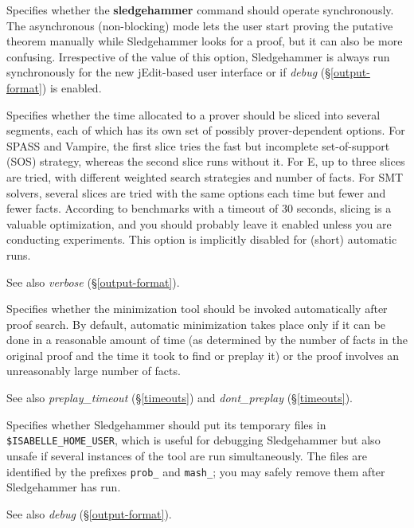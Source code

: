 \documentclass[a4paper,12pt]{article}
\begin{document}
\begin{enum}
Specifies whether the \textbf{sledgehammer} command should operate
synchronously. The asynchronous (non-blocking) mode lets the user start proving
the putative theorem manually while Sledgehammer looks for a proof, but it can
also be more confusing. Irrespective of the value of this option, Sledgehammer
is always run synchronously for the new jEdit-based user interface or if
\textit{debug} (\S\ref{output-format}) is enabled.

Specifies whether the time allocated to a prover should be sliced into several
segments, each of which has its own set of possibly prover-dependent options.
For SPASS and Vampire, the first slice tries the fast but incomplete
set-of-support (SOS) strategy, whereas the second slice runs without it. For E,
up to three slices are tried, with different weighted search strategies and
number of facts. For SMT solvers, several slices are tried with the same options
each time but fewer and fewer facts. According to benchmarks with a timeout of
30 seconds, slicing is a valuable optimization, and you should probably leave it
enabled unless you are conducting experiments. This option is implicitly
disabled for (short) automatic runs.

\nopagebreak
{\small See also \textit{verbose} (\S\ref{output-format}).}

Specifies whether the minimization tool should be invoked automatically after
proof search. By default, automatic minimization takes place only if
it can be done in a reasonable amount of time (as determined by
the number of facts in the original proof and the time it took to find or
preplay it) or the proof involves an unreasonably large number of facts.

\nopagebreak
{\small See also \textit{preplay\_timeout} (\S\ref{timeouts})
and \textit{dont\_preplay} (\S\ref{timeouts}).}

Specifies whether Sledgehammer should put its temporary files in
\texttt{\$ISA\-BELLE\_\allowbreak HOME\_\allowbreak USER}, which is useful for
debugging Sledgehammer but also unsafe if several instances of the tool are run
simultaneously. The files are identified by the prefixes \texttt{prob\_} and
\texttt{mash\_}; you may safely remove them after Sledgehammer has run.

\nopagebreak
{\small See also \textit{debug} (\S\ref{output-format}).}
\end{enum}
\end{document}
